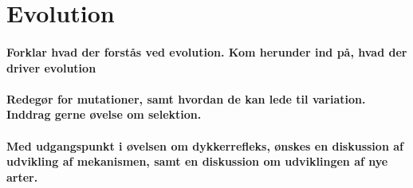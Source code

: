 \newpage
\part{Evolution}
\subsection*{Forklar hvad der forstås ved evolution. Kom herunder ind på, hvad der driver evolution}
\subsection*{Redegør for mutationer, samt hvordan de kan lede til variation. Inddrag gerne øvelse om selektion.}
\subsection*{Med udgangspunkt i øvelsen om dykkerrefleks, ønskes en diskussion af udvikling af mekanismen, samt en diskussion om udviklingen af nye arter.}